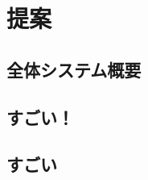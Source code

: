 \documentclass[./main]{subfiles}
\begin{document}
\section{提案}
\label{sec: second}


\subsection{全体システム概要}
\label{subsec: second-overview}



\subsection{すごい！}
\label{subsec: second-tracking}



\subsection{すごい}
\label{subsec: second-current_calc}













\biblio
\end{document}
